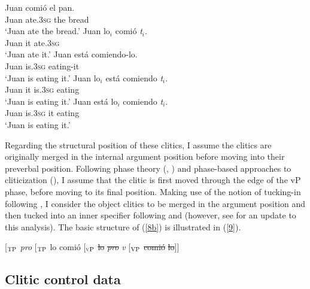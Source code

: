 \documentclass[output=paper,colorlinks,citecolor=brown]{langscibook}
\begin{document}
\ea \label{cliticpositions}
\ea \label{8a}
{
\gll Juan comió el pan. \\
Juan ate.\textsc{3sg} the bread \\
\glt ‘Juan ate the bread.’
}
\ex \label{8b}
{
\gll Juan lo$_i$ comió \textit{t$_i$}. \\
Juan it ate.\textsc{3sg} \\
\glt ‘Juan ate it.’
}
\ex \label{8c}
{
\gll Juan está comiendo-lo. \\
Juan is.\textsc{3sg} eating-it \\
\glt ‘Juan is eating it.'
}
\ex \label{8d}
{
\gll Juan lo$_i$ está comiendo \textit{t$_i$}. \\
Juan it is.\textsc{3sg} eating \\
\glt ‘Juan is eating it.’
}
\ex \label{8e}
{
\gll *Juan está lo$_i$ comiendo \textit{t$_i$}.\\
Juan is.\textsc{3sg} it eating \\
\glt ‘Juan is eating it.’
}
\z
\z

Regarding the structural position of these clitics, I assume the clitics are originally merged in the internal argument position before moving into their preverbal position. Following phase theory (\citealt{chomsky2000minimalist}, \citeyear{chomsky2001derivation}) and phase-based approaches to cliticization (\citealt{gallego2016phase}), I assume that the clitic is first moved through the edge of the vP phase, before moving to its final position. Making use of the notion of tucking-in following \citet{richards1997moves}, I consider the object clitics to be merged in the argument position and then tucked into an inner specifier following \citet{nevins2011multiple} and \citet{kramer2014clitic} (however, see  for an update to this analysis). The basic structure of (\ref{8b}) is illustrated in (\ref{9}).

\ea \label{9}
{[{$_\textsc{TP}$} \textit{pro} [{$_\textsc{TP}$} lo comió [{$_\textsc{vP}$} \sout{lo} \textit{\sout{pro}} \textit{v} [{$_\textsc{VP}$} \sout{comió} \sout{lo}]]}
\z

\subsection{Clitic control data} \label{Section3.2}
\end{document}
